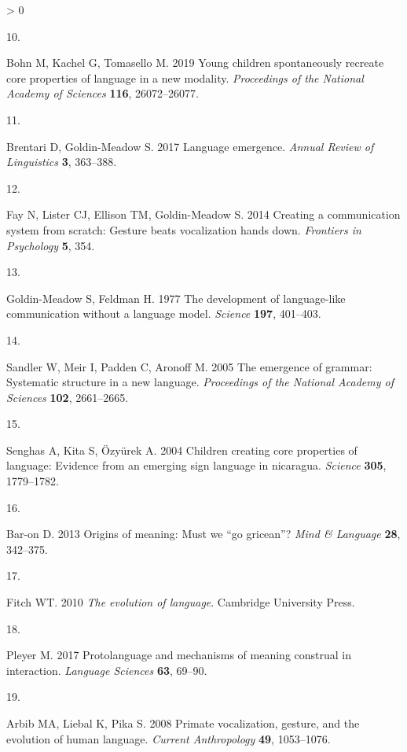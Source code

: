 \documentclass[
  english,
  man,floatsintext]{apa6}
\newlength{\cslhangindent}
\newlength{\csllabelwidth}
\newenvironment{CSLReferences}[2] %
 {%
  \setlength{\parindent}{0pt}
  \ifodd #1 \everypar{\setlength{\hangindent}{\cslhangindent}}\ignorespaces\fi
  \ifnum #2 > 0
  \setlength{\parskip}{#2\baselineskip}
  \fi
 }%
 {}
\newcommand{\CSLLeftMargin}[1]{\parbox[t]{\csllabelwidth}{#1}}
\newcommand{\CSLRightInline}[1]{\parbox[t]{\linewidth - \csllabelwidth}{#1}\break}
\begin{document}
\begin{CSLReferences}{0}{0}
\leavevmode\hypertarget{ref-bohn2019young}{}%
\CSLLeftMargin{10. }
\CSLRightInline{Bohn M, Kachel G, Tomasello M. 2019 Young children spontaneously recreate core properties of language in a new modality. \emph{Proceedings of the National Academy of Sciences} \textbf{116}, 26072--26077.}

\leavevmode\hypertarget{ref-brentari2017language}{}%
\CSLLeftMargin{11. }
\CSLRightInline{Brentari D, Goldin-Meadow S. 2017 Language emergence. \emph{Annual Review of Linguistics} \textbf{3}, 363--388.}

\leavevmode\hypertarget{ref-fay2014creating}{}%
\CSLLeftMargin{12. }
\CSLRightInline{Fay N, Lister CJ, Ellison TM, Goldin-Meadow S. 2014 Creating a communication system from scratch: Gesture beats vocalization hands down. \emph{Frontiers in Psychology} \textbf{5}, 354.}

\leavevmode\hypertarget{ref-goldin1977development}{}%
\CSLLeftMargin{13. }
\CSLRightInline{Goldin-Meadow S, Feldman H. 1977 The development of language-like communication without a language model. \emph{Science} \textbf{197}, 401--403.}

\leavevmode\hypertarget{ref-sandler2005emergence}{}%
\CSLLeftMargin{14. }
\CSLRightInline{Sandler W, Meir I, Padden C, Aronoff M. 2005 The emergence of grammar: Systematic structure in a new language. \emph{Proceedings of the National Academy of Sciences} \textbf{102}, 2661--2665.}

\leavevmode\hypertarget{ref-senghas2004children}{}%
\CSLLeftMargin{15. }
\CSLRightInline{Senghas A, Kita S, Özyürek A. 2004 Children creating core properties of language: Evidence from an emerging sign language in nicaragua. \emph{Science} \textbf{305}, 1779--1782.}

\leavevmode\hypertarget{ref-bar2013origins}{}%
\CSLLeftMargin{16. }
\CSLRightInline{Bar-on D. 2013 Origins of meaning: Must we {``go gricean''}? \emph{Mind \& Language} \textbf{28}, 342--375.}

\leavevmode\hypertarget{ref-fitch2010evolution}{}%
\CSLLeftMargin{17. }
\CSLRightInline{Fitch WT. 2010 \emph{The evolution of language}. Cambridge University Press. }

\leavevmode\hypertarget{ref-pleyer2017protolanguage}{}%
\CSLLeftMargin{18. }
\CSLRightInline{Pleyer M. 2017 Protolanguage and mechanisms of meaning construal in interaction. \emph{Language Sciences} \textbf{63}, 69--90.}

\leavevmode\hypertarget{ref-arbib2008primate}{}%
\CSLLeftMargin{19. }
\CSLRightInline{Arbib MA, Liebal K, Pika S. 2008 Primate vocalization, gesture, and the evolution of human language. \emph{Current Anthropology} \textbf{49}, 1053--1076.}


\end{CSLReferences}
\end{document}
